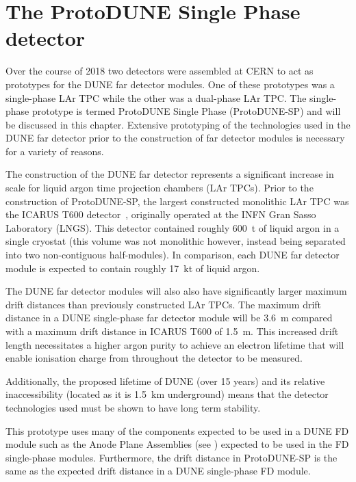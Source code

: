 \chapter{The ProtoDUNE Single Phase detector}
\label{sec:protodune}

Over the course of 2018 two detectors were assembled at CERN to act as prototypes for the DUNE far detector modules.
One of these prototypes was a single-phase LAr TPC while the other was a dual-phase LAr TPC.
The single-phase prototype is termed ProtoDUNE Single Phase (ProtoDUNE-SP) and will be discussed in this chapter.
Extensive prototyping of the technologies used in the DUNE far detector prior to the construction of far detector modules is necessary for a variety of reasons.

The construction of the DUNE far detector represents a significant increase in scale for liquid argon time projection chambers (LAr TPCs).
Prior to the construction of ProtoDUNE-SP, the largest constructed monolithic LAr TPC was the ICARUS T600 detector~\cite{icarus}, originally operated at the INFN Gran Sasso Laboratory (LNGS).
This detector contained roughly \SI{600}{\tonne} of liquid argon in a single cryostat (this volume was not monolithic however, instead being separated into two non-contiguous half-modules).
In comparison, each DUNE far detector module is expected to contain roughly \SI{17}{\kilo\tonne} of liquid argon.

The DUNE far detector modules will also also have significantly larger maximum drift distances than previously constructed LAr TPCs.
The maximum drift distance in a DUNE single-phase far detector module will be \SI{3.6}{\m} compared with a maximum drift distance in ICARUS T600 of \SI{1.5}{\m}.
This increased drift length necessitates a higher argon purity to achieve an electron lifetime that will enable ionisation charge from throughout the detector to be measured.

Additionally, the proposed lifetime of DUNE (over 15 years) and its relative inaccessibility (located as it is \SI{1.5}{\kilo\metre} underground) means that the detector technologies used must be shown to have long term stability.

This prototype uses many of the components expected to be used in a DUNE FD module such as the Anode Plane Assemblies (see ) expected to be used in the FD single-phase modules.
Furthermore, the drift distance in ProtoDUNE-SP is the same as the expected drift distance in a DUNE single-phase FD module.

